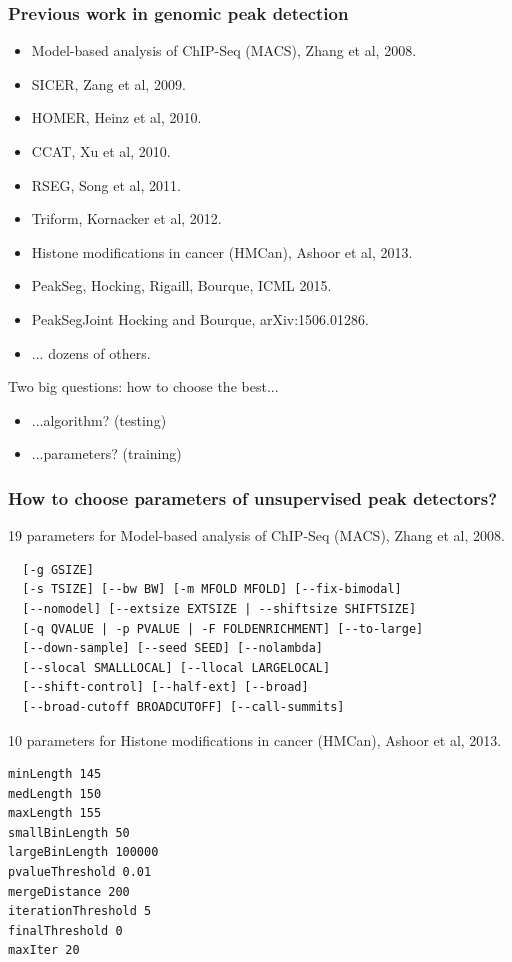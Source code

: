 \documentclass{beamer}
\begin{document}
\begin{frame}
  \frametitle{Previous work in genomic peak detection}
  \begin{itemize}
  \item Model-based analysis of ChIP-Seq (MACS), Zhang et al, 2008.
  \item SICER, Zang et al, 2009.
  \item HOMER, Heinz et al, 2010.
  \item CCAT, Xu et al, 2010.
  \item RSEG, Song et al, 2011.
  \item Triform, Kornacker et al, 2012.
  \item Histone modifications in cancer (HMCan), Ashoor et al, 2013.
  \item PeakSeg, Hocking, Rigaill, Bourque, ICML 2015.
  \item PeakSegJoint Hocking and Bourque, arXiv:1506.01286.
  \item ... dozens of others.
  \end{itemize}
  Two big questions: how to choose the best...
  \begin{itemize}
  \item ...algorithm? (testing)
  \item ...parameters? (training)
  \end{itemize}
\end{frame}

\begin{frame}[fragile]
  \frametitle{How to choose parameters of unsupervised peak
    detectors?}
\scriptsize
19 parameters for Model-based analysis of ChIP-Seq (MACS), Zhang et al, 2008.
\begin{verbatim}
  [-g GSIZE]
  [-s TSIZE] [--bw BW] [-m MFOLD MFOLD] [--fix-bimodal]
  [--nomodel] [--extsize EXTSIZE | --shiftsize SHIFTSIZE]
  [-q QVALUE | -p PVALUE | -F FOLDENRICHMENT] [--to-large]
  [--down-sample] [--seed SEED] [--nolambda]
  [--slocal SMALLLOCAL] [--llocal LARGELOCAL]
  [--shift-control] [--half-ext] [--broad]
  [--broad-cutoff BROADCUTOFF] [--call-summits]
\end{verbatim}
10 parameters for Histone modifications in cancer (HMCan),
Ashoor et al, 2013.
\begin{verbatim}
minLength 145
medLength 150
maxLength 155
smallBinLength 50
largeBinLength 100000
pvalueThreshold 0.01
mergeDistance 200
iterationThreshold 5
finalThreshold 0
maxIter 20
\end{verbatim}
\end{frame}
\end{document}
